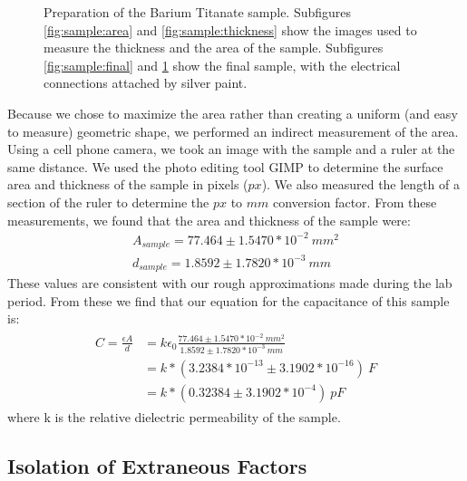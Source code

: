 \documentclass[%
 reprint,
 amsmath,amssymb,
 aps,
 pra,
]{revtex4-1}
\begin{document}
\begin{figure}[H]
\begin{subfigure}{0.22\textwidth}
		\caption{}
		\label{fig:sample:inplace}
	\end{subfigure}
	\caption{Preparation of the Barium Titanate sample. Subfigures \ref{fig:sample:area} and \ref{fig:sample:thickness} show the images used to measure the thickness and the area of the sample. Subfigures \ref{fig:sample:final} and \ref{fig:sample:inplace} show the final sample, with the electrical connections attached by silver paint.}
	\label{fig:sample}
\end{figure}

Because we chose to maximize the area rather than creating a uniform (and easy to measure) geometric shape, we performed an indirect measurement of the area. Using a cell phone camera, we took an image with the sample and a ruler at the same distance. We used the photo editing tool GIMP to determine the surface area and thickness of the sample in pixels ($px$). We also measured the length of a section of the ruler to determine the $px$ to $mm$ conversion factor. From these measurements, we found that the area and thickness of the sample were:
\begin{gather}
	A_{sample} = 77.464 \pm 1.5470*10^{-2} ~mm^2  \nonumber \\
	d_{sample} = 1.8592 \pm 1.7820*10^{-3} ~mm	 \nonumber
\end{gather}
These values are consistent with our rough approximations made during the lab period. From these we find that our equation for the capacitance of this sample is:
\begin{gather}
	\begin{align}
		C = \frac{\epsilon A}{d} & = k \epsilon_0 \frac{77.464 \pm 1.5470*10^{-2} ~mm^2}{1.8592 \pm 1.7820*10^{-3} ~mm} \nonumber \\
		& = k*(3.2384*10^{-13} \pm 3.1902*10^{-16})~F \nonumber \\
		& = k*(0.32384 \pm 3.1902*10^{-4})~pF \nonumber
	\end{align}
\end{gather}
where k is the relative dielectric permeability of the sample. 


\subsection{Isolation of Extraneous Factors}\label{section:factors}
\end{document}
